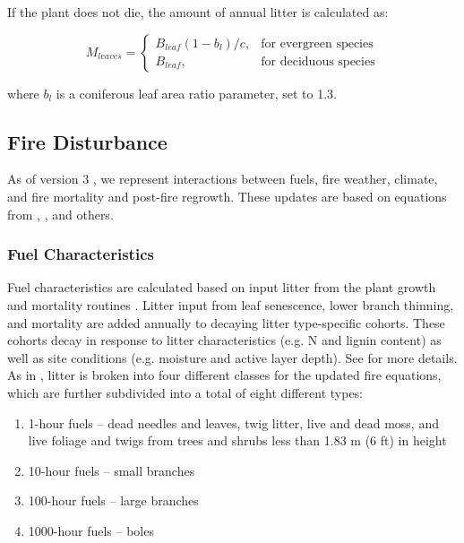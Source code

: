 \documentclass[a4paper, 12pt] {report}
\begin{document}
If the plant does not die, the amount of annual litter is calculated as: 

\begin{equation} \label{annlit}
M_{leaves} = \begin{cases}
B_{leaf}(1 - b_l)/c, & \text{for evergreen species} \\
B_{leaf}, & \text{for deciduous species} 
\end{cases}
\end{equation}

where $b_l$ is a coniferous leaf area ratio parameter, set to 1.3.

\subsection{Fire Disturbance} \label{disturbances}
 
As of version 3 \cite{foster_bottom-up_2022}, we represent interactions between fuels, fire weather, climate, and fire mortality and post-fire regrowth. These updates are based on equations from , , and others.

\subsubsection{Fuel Characteristics}

Fuel characteristics are calculated based on input litter from the plant growth and mortality routines \cite{fosterImportanceTreeSpecieslevel2019}. Litter input from leaf senescence, lower branch thinning, and mortality are added annually to decaying litter type-specific cohorts. These cohorts decay in response to litter characteristics (e.g. N and lignin content) as well as site conditions (e.g. moisture and active layer depth). See  for more details. As in , litter is broken into four different classes for the updated fire equations, which are further subdivided into a total of eight different types:

\begin{enumerate}
	\item 1-hour fuels -- dead needles and leaves, twig litter, live and dead moss, and live foliage and twigs from trees and shrubs less than 1.83 m (6 ft) in height
	\item 10-hour fuels -- small branches
	\item 100-hour fuels -- large branches
	\item 1000-hour fuels -- boles
\end{enumerate}
\end{document}
